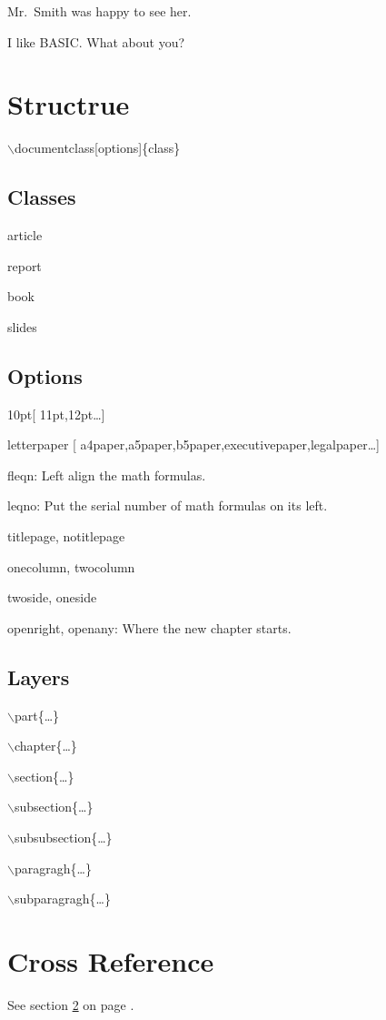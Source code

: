 \documentclass[a4paper]{report}
\begin{document}
Mr.~Smith was happy to see her.

I like BASIC\@. What about you?

\section{Structrue}

$\backslash$documentclass[options]\{class\}

\subsection{Classes}

article

report

book

slides

\subsection{Options}

10pt[ 11pt,12pt\ldots]

letterpaper [
a4paper,a5paper,b5paper,executivepaper,legalpaper\ldots]

fleqn: Left align the math formulas.

leqno: Put the serial number of math formulas on its left.

titlepage, notitlepage

onecolumn, twocolumn

twoside, oneside

openright, openany: Where the new chapter starts.

\subsection{Layers}


$\backslash$part\{\ldots\}

$\backslash$chapter\{\ldots\}

$\backslash$section\{\ldots\}

$\backslash$subsection\{\ldots\}

$\backslash$subsubsection\{\ldots\}

$\backslash$paragragh\{\ldots\}

$\backslash$subparagragh\{\ldots\}

\section{Cross Reference}
\label{Cross Reference} See section \ref{Cross Reference} on page
\pageref{Cross Reference}.
\end{document}
